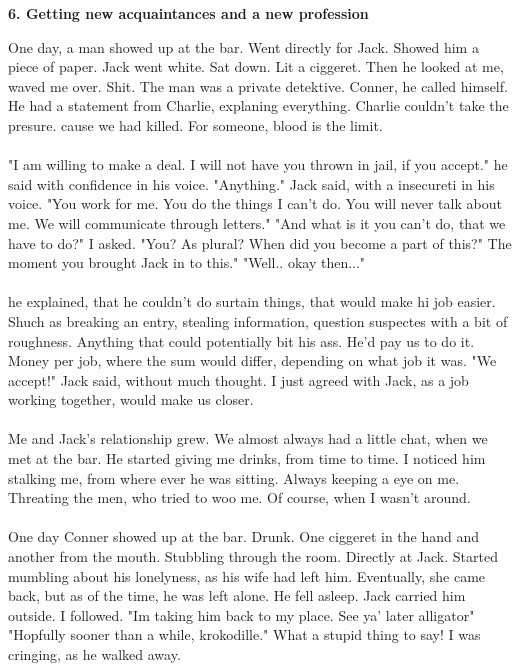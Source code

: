 \documentclass[]{article}
\begin{document}
\newpage

\begin{center}
	\large\textbf{6. Getting new acquaintances and a new profession}
\end{center}

One day, a man showed up at the bar. Went directly for Jack. Showed him a piece of paper. Jack went white. Sat down. Lit a ciggeret. Then he looked at me, waved me over. Shit. The man was a private detektive. Conner, he called himself. He had a statement from Charlie, explaning everything. Charlie couldn't take the presure. cause we had killed. For someone, blood is the limit. 
\\ \\
"I am willing to make a deal. I will not have you thrown in jail, if you accept." he said with confidence in his voice. "Anything." Jack said, with a insecureti in his voice. "You work for me. You do the things I can't do. You will never talk about me. We will communicate through letters." "And what is it you can't do, that we have to do?" I asked. "You? As plural? When did you become a part of this?" The moment you brought Jack in to this." "Well.. okay then..."
\\ \\
he explained, that he couldn't do surtain things, that would make hi job easier. Shuch as breaking an entry, stealing information, question suspectes with a bit of roughness. Anything that could potentially bit his ass. He'd pay us to do it. Money per job, where the sum would differ, depending on what job it was. "We accept!" Jack said, without much thought. I just agreed with Jack, as a job working together, would make us closer.
\\ \\
Me and Jack's relationship grew. We almost always had a little chat, when we met at the bar. He started giving me drinks, from time to time. I noticed him stalking me, from where ever he was sitting. Always keeping a eye on me. Threating the men, who tried to woo me. Of course, when I wasn't around. 
\\ \\
One day Conner showed up at the bar. Drunk. One ciggeret in the hand and another from the mouth. Stubbling through the room. Directly at Jack. Started mumbling about his lonelyness, as his wife had left him. Eventually, she came back, but as of the time, he was left alone. He fell asleep. Jack carried him outside. I followed. "Im taking him back to my place. See ya' later alligator" "Hopfully sooner than a while, krokodille." What a stupid thing to say! I was cringing, as he walked away.
\end{document}
